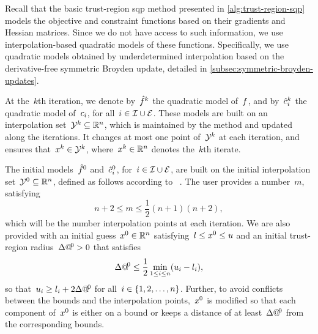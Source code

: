 Recall that the basic trust-region \gls{sqp} method presented in \cref{alg:trust-region-sqp} models the objective and constraint functions based on their gradients and Hessian matrices.
Since we do not have access to such information, we use interpolation-based quadratic models of these functions.
Specifically, we use quadratic models obtained by underdetermined interpolation based on the derivative-free symmetric Broyden update, detailed in \cref{subsec:symmetric-broyden-updates}.

At the~$k$th iteration, we denote by~$\objm[k]$ the quadratic model of~$f$, and by~$\conm[k]{i}$ the quadratic model of~$c_{i}$, for all~$i \in \mathcal{I} \cup \mathcal{E}$.
These models are built on an interpolation set~$\xpt[k] \subseteq \R^n$, which is maintained by the method and updated along the iterations.
It changes at most one point of~$\xpt[k]$ at each iteration, and ensures that~$\iter[k] \in \xpt[k]$, where~$\iter[k] \in \R^n$ denotes the~$k$th iterate.

The initial models~$\objm[0]$ and~$\conm[0]{i}$, for~$i \in \mathcal{I} \cup \mathcal{E}$, are built on the initial interpolation set~$\xpt[0] \subseteq \R^n$, defined as follows according to \citeauthor{Powell_2009}~\cite{Powell_2009}.
The user provides a number~$m$, satisfying
\begin{equation*}
    n + 2 \le m \le \frac{1}{2} (n + 1) (n + 2),
\end{equation*}
which will be the number interpolation points at each iteration.
We are also provided with an initial guess~$\iter[0] \in \R^n$ satisfying~$\xl \le \iter[0] \le \xu$ and an initial trust-region radius~$\rad[0] > 0$ that satisfies
\begin{equation*}
    \rad[0] \le \frac{1}{2} \min_{1 \le i \le n} (\xu_i - \xl_i),
\end{equation*}
so that~$\xu_i \ge \xl_i + 2 \rad[0]$ for all~$i \in \{1, 2, \dots, n\}$.
Further, to avoid conflicts between the bounds and the interpolation points,~$\iter[0]$ is modified so that each component of~$\iter[0]$ is either on a bound or keeps a distance of at least~$\rad[0]$ from the corresponding bounds.

